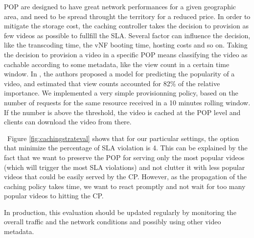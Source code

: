 POP are designed to have great network performances for a given geographic area, and need to be spread throught the territory for a reduced price.
In order to mitigate the storage cost, the caching controller takes the decision to provision as few videos as possible to fullfill the SLA. Several factor can influence the decision, like the transcoding time, the vNF booting time, hosting costs and so on.
Taking the decision to provision a video in a specific POP means classifying the video as cachable according to some metadata, like the view count in a certain time window.
In \cite{silvestre_boosting_2015}, the authors proposed a model for predicting the popularity of a video, and estimated that view counts accounted for 82\% of the relative importance. 
We implemented a very simple provisionning policy, based on the number of requests for the same resource received in a 10 minutes rolling window. If the number is above the threshold, the video is cached at the POP level and clients can download the video from there.

~Figure \ref{fig:cachingstrateval} shows that for our particular settings, the option that minimize the percentage of SLA violation is 4. This can be explained by the fact that we want to preserve the POP for serving only the most popular videos (which will trigger the most SLA violations) and not clutter it with less popular videos that could be easily served by the CP. However, as the propagation of the caching policy takes time, we want to react promptly and not wait for too many popular videos to hitting the CP.

In production, this evaluation should be updated regularly by monitoring the overall traffic and the network conditions and possibly using other video metadata.





